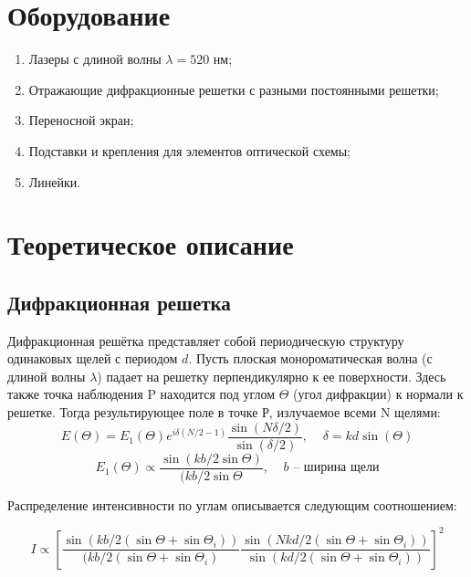 \documentclass[a4paper, 12pt]{article}
\begin{document}
\section{Оборудование}

\begin{enumerate}

	\item Лазеры с длиной волны $\lambda = 520 $ нм;

	\item Отражающие дифракционные решетки с разными постоянными решетки;

	\item Переносной экран;

	\item Подставки и крепления для элементов оптической схемы;

	\item Линейки.

\end{enumerate}

\section{Теоретическое описание}


\subsection{Дифракционная решетка}

Дифракционная решётка представляет собой периодическую структуру одинаковых щелей с периодом $d$. Пусть плоская монороматическая волна (с длиной волны $\lambda$) падает на решетку перпендикулярно к ее поверхности. Здесь также точка  наблюдения P находится под углом $\Theta$ (угол дифракции) к нормали к решетке. Тогда результирующее поле в точке Р, излучаемое всеми N щелями:
\begin{equation}
E(\Theta) = E_1(\Theta)e^{i\delta(N/2-1)}\frac{\sin(N\delta/2)} {\sin(\delta/2)},\;\;\;\; \delta = kd\sin(\Theta)
\end{equation}
\[ E_1(\Theta) \propto \frac{\sin(kb/2\sin\Theta)} {(kb/2\sin\Theta}, \;\;\;\; b\text{ -- ширина щели}\]

Распределение интенсивности по углам описывается следующим соотношением:

\begin{equation}
I \propto \left[\frac{\sin(kb/2(\sin\Theta+\sin\Theta_i))} {(kb/2(\sin\Theta+\sin\Theta_i)} \frac{\sin(Nkd/2(\sin\Theta+\sin\Theta_i))} {\sin(kd/2(\sin\Theta+\sin\Theta_i))}\right]^2
\end{equation}
\end{document}
